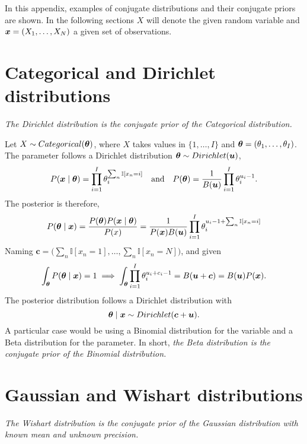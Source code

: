 In this appendix, examples of conjugate distributions and their conjugate priors are shown. In the following sections \(X\) will denote the given random variable and \(\bm{x} = (X_{1},\dots,X_{N})\) a given set of observations.

\section*{Categorical and Dirichlet distributions}\label{ap:C-D}

\emph{The Dirichlet distribution is the conjugate prior of the Categorical distribution.}

Let \(X \sim Categorical(\bm{\theta})\), where \(X\) takes values in \(\{1,\dots,I\}\) and \(\bm{\theta} = (\theta_{1},\dots,\theta_{I})\). The parameter follows a Dirichlet distribution \(\bm{\theta} \sim Dirichlet(\bm{u})\),
\[
  P(\bm{x} \mid \bm{\theta}) = \prod_{i=1}^{I}\theta_{i}^{\sum_{n} \mathbb{I}[x_{n}=i]} \quad \text{and} \quad P(\bm{\theta}) = \frac{1}{B(\bm{u})}\prod_{i=1}^{I}\theta_{i}^{u_{i}-1}.
\]
The posterior is therefore,
\[
  P(\bm{\theta} \mid \bm{x}) = \frac{P(\bm{\theta})P(\bm{x} \mid \bm{\theta})}{P(x)} = \frac{1}{P(\bm{x})B(\bm{u})}\prod_{i=1}^{I}\theta_{i}^{u_{i}-1 + \sum_{n} \mathbb{I}[x_{n}=i]}
\]
Naming \(\bm{c} = \big(\sum_{n}\mathbb{I}[x_{n}=1], \dots, \sum_{n}\mathbb{I}[x_{n}=N]\big)\),
and given
\[
  \int_{\bm{\theta}}P(\bm{\theta} \mid \bm{x}) = 1 \implies \int_{\bm{\theta}}\prod_{i=1}^{I}\theta_{i}^{u_{i} + c_{i} - 1} = B(\bm{u} + \bm{c}) = B(\bm{u})P(\bm{x}).
\]
The posterior distribution follows a Dirichlet distribution with
\[
  \bm{\theta} \mid \bm{x} \sim Dirichlet(\bm{c} + \bm{u}).
\]
A particular case would be using a Binomial distribution for the variable and a Beta distribution for the parameter. In short, \emph{the Beta distribution is the conjugate prior of the Binomial distribution.}

\section*{Gaussian and Wishart distributions}

\emph{The Wishart distribution is the conjugate prior of the Gaussian distribution with known mean and unknown precision.}

